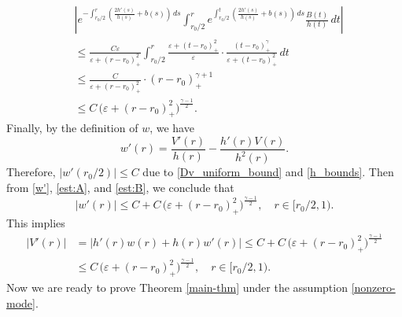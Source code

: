 \documentclass[reqno, 10pt]{amsart}
\theoremstyle{plain}
\theoremstyle{definition}
\theoremstyle{remark}
\numberwithin{equation}{section}
\begin{document}
\begin{equation}\label{est:B}
\begin{aligned}
    & \left| e^{-\int_{r_0/2}^r \left(\frac{2h'(s)}{h(s)} + b(s)\right) \, ds} \int_{r_0/2}^r  e^{\int_{r_0/2}^t \left(\frac{2h'(s)}{h(s)} + b(s)\right) \, ds} \frac{B(t)}{h(t)} \, dt \right|\\
     &\le  \frac{C\varepsilon}{\varepsilon + (r - r_0)_+^2} \int_{r_0/2}^r \frac{\varepsilon + (t - r_0)_+^2}{\varepsilon}\cdot \frac{(t-r_0)_+^\gamma}{\varepsilon + (t-r_0)_+^2} \, dt\\
     &\le  \frac{C}{\varepsilon + (r - r_0)_+^2} \cdot (r-r_0)_+^{\gamma+1}\\
    &\le  C\,\big(\varepsilon + (r-r_0)_+^2\big)^{\frac{\gamma-1}{2}}.
\end{aligned}
\end{equation}
Finally, by the definition of $w$, we have
$$
w'(r) = \frac{V'(r)}{h(r)} - \frac{h'(r)V(r)}{h^2(r)}.
$$
Therefore, $|w'(r_0/2)| \le C$ due to \eqref{Dv_uniform_bound} and \eqref{h_bounds}. Then from \eqref{w'}, \eqref{est:A}, and \eqref{est:B}, we conclude that
$$|w'(r)| \le C+C\,\big(\varepsilon + (r-r_0)_+^2\big)^{\frac{\gamma-1}2}, \quad  r\in [r_0/2, 1).$$  
This implies
\begin{equation}\label{V'-bound}
\begin{aligned}
|V'(r)| &=  |h'(r) w(r) + h(r) w'(r)| \le C+ C\,\big(\varepsilon + (r-r_0)_+^2\big)^{\frac{\gamma-1}2}\\ &\le C\,\big(\varepsilon + (r-r_0)_+^2\big)^{\frac{\gamma-1}2}, \quad r \in [r_0/2, 1).
\end{aligned}
\end{equation}
Now we are ready to prove Theorem \ref{main-thm} under the assumption \eqref{nonzero-mode}.
\end{document}
